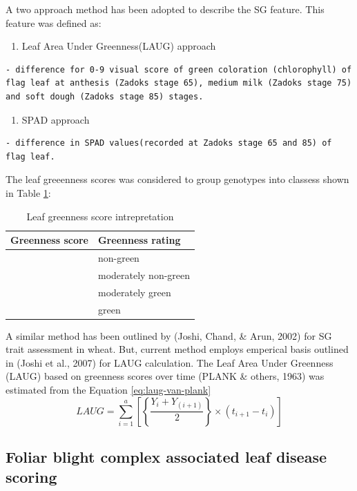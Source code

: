 \documentclass[12pt,oneside]{dukestatscithesis} %
\providecommand{\tightlist}{%
  \setlength{\itemsep}{0pt}\setlength{\parskip}{0pt}}
\begin{document}
A two approach method has been adopted to describe the SG feature. This feature was defined as:
\begin{enumerate}
\def\labelenumi{\arabic{enumi}.}
\tightlist
\item
  Leaf Area Under Greenness(LAUG) approach
\end{enumerate}
\begin{verbatim}
- difference for 0-9 visual score of green coloration (chlorophyll) of flag leaf at anthesis (Zadoks stage 65), medium milk (Zadoks stage 75) and soft dough (Zadoks stage 85) stages.
\end{verbatim}
\begin{enumerate}
\def\labelenumi{\arabic{enumi}.}
\setcounter{enumi}{1}
\tightlist
\item
  SPAD approach
\end{enumerate}
\begin{verbatim}
- difference in SPAD values(recorded at Zadoks stage 65 and 85) of flag leaf.
\end{verbatim}
The leaf greeenness scores was considered to group genotypes into classess shown in Table \ref{tab:leaf-greenness}:
\begin{table}[H]

\caption{\label{tab:leaf-greenness}Leaf greenness score intrepretation}
\centering
\begin{tabular}[t]{ll}
\toprule
\textbf{Greenness score} & \textbf{Greenness rating}\\
\midrule
 & non-green\\
 & moderately non-green\\
 & moderately green\\
 & green\\
\bottomrule
\end{tabular}
\end{table}
A similar method has been outlined by (Joshi, Chand, \& Arun, 2002) for SG trait assessment in wheat. But, current method employs emperical basis outlined in (Joshi et al., 2007) for LAUG calculation. The Leaf Area Under Greenness (LAUG) based on greenness scores over time (PLANK \& others, 1963) was estimated from the Equation \eqref{eq:laug-van-plank}
\begin{equation}
LAUG = \sum_{i = 1}^a \left [\left\{ \frac{Y_i + Y_{(i+1)}}{2}\right\} \times (t_{i+1}-t_i)\right ]
\label{eq:laug-van-plank}
\end{equation}
\hypertarget{foliar-blight-complex-associated-leaf-disease-scoring}{%
\subsection{Foliar blight complex associated leaf disease scoring}\label{foliar-blight-complex-associated-leaf-disease-scoring}}
\end{document}
